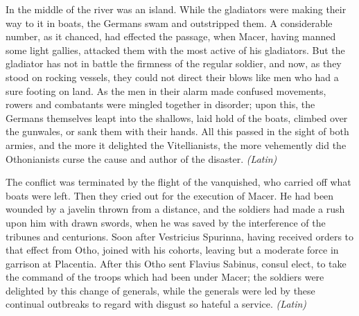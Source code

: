
In the middle of the river was an island. While the gladiators were making their way to it in boats, the Germans swam and outstripped them. A considerable number, as it chanced, had effected the passage, when Macer, having manned some light gallies, attacked them with the most active of his gladiators. But the gladiator has not in battle the firmness of the regular soldier, and now, as they stood on rocking vessels, they could not direct their blows like men who had a sure footing on land. As the men in their alarm made confused movements, rowers and combatants were mingled together in disorder; upon this, the Germans themselves leapt into the shallows, laid hold of the boats, climbed over the gunwales, or sank them with their hands. All this passed in the sight of both armies, and the more it delighted the Vitellianists, the more vehemently did the Othonianists curse the cause and author of the disaster. \emph{(Latin)}


The conflict was terminated by the flight of the vanquished, who carried off what boats were left. Then they cried out for the execution of Macer. He had been wounded by a javelin thrown from a distance, and the soldiers had made a rush upon him with drawn swords, when he was saved by the interference of the tribunes and centurions. Soon after Vestricius Spurinna, having received orders to that effect from Otho, joined with his cohorts, leaving but a moderate force in garrison at Placentia. After this Otho sent Flavius Sabinus, consul elect, to take the command of the troops which had been under Macer; the soldiers were delighted by this change of generals, while the generals were led by these continual outbreaks to regard with disgust so hateful a service. \emph{(Latin)}


